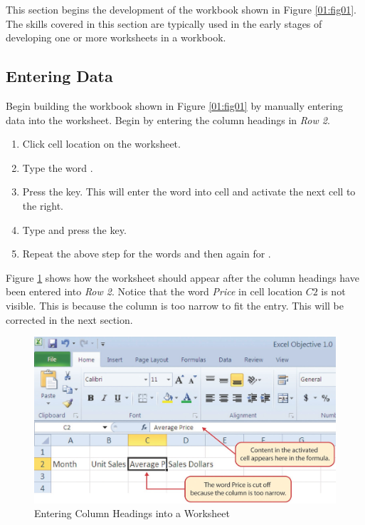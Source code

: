 This section begins the development of the workbook shown in Figure \ref{01:fig01}. The skills covered in this section are typically used in the early stages of developing one or more worksheets in a workbook.

\subsection{Entering Data}

Begin building the workbook shown in Figure \ref{01:fig01} by manually entering data into the worksheet. Begin by entering the column headings in \textit{Row 2}.

\begin{enumerate}
	\item Click cell location  on the worksheet.
	\item Type the word .
	\item Press the  key. This will enter the word into cell  and activate the next cell to the right.
	\item Type  and press the  key.
	\item Repeat the above step for the words  and then again for .
\end{enumerate}

Figure \ref{01:fig15} shows how the worksheet should appear after the column headings have been entered into \textit{Row 2}. Notice that the word \textit{Price} in cell location $ C2 $ is not visible. This is because the column is too narrow to fit the entry. This will be corrected in the next section.

\begin{figure}[H]
	\centering
	\includegraphics[width=\maxwidth{.95\linewidth}]{gfx/ch01_fig15}
	\caption{Entering Column Headings into a Worksheet}
	\label{01:fig15}
\end{figure}

